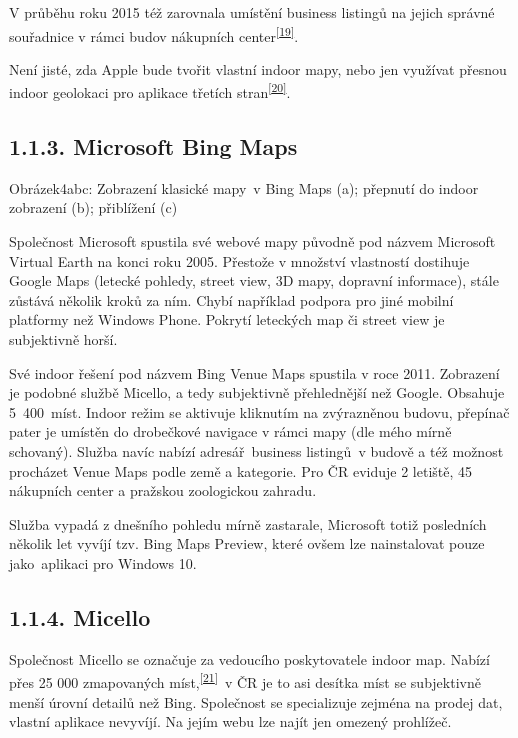 V průběhu roku 2015 též zarovnala umístění business listingů na jejich správné souřadnice v rámci budov nákupních center\textsuperscript{\href{}{{[}19{]}}}.~

Není jisté, zda Apple bude tvořit vlastní indoor mapy, nebo jen využívat přesnou indoor geolokaci pro aplikace třetích stran\textsuperscript{\href{}{{[}20{]}}}.

\subsection{1.1.3. Microsoft Bing Maps}\label{microsoft-bing-maps}

Obrázek4abc: Zobrazení klasické mapy~v Bing Maps (a); přepnutí do indoor zobrazení (b); přiblížení (c)

Společnost Microsoft spustila své webové mapy původně pod názvem Microsoft Virtual Earth na konci roku 2005. Přestože v množství vlastností dostihuje Google Maps (letecké pohledy, street view, 3D mapy, dopravní informace), stále zůstává několik kroků za ním. Chybí například podpora pro jiné mobilní platformy než Windows Phone. Pokrytí leteckých map či street view je subjektivně horší.

Své indoor řešení pod názvem Bing Venue Maps spustila v roce 2011. Zobrazení je podobné službě Micello, a tedy subjektivně přehlednější než Google. Obsahuje 5~400~míst. Indoor režim se aktivuje kliknutím na zvýrazněnou budovu, přepínač pater je umístěn do drobečkové navigace v rámci mapy (dle mého mírně schovaný). Služba navíc nabízí adresář~business listingů~v budově a též možnost procházet Venue Maps podle země a kategorie. Pro ČR eviduje 2 letiště, 45 nákupních center a pražskou zoologickou zahradu.

Služba vypadá z dnešního pohledu mírně zastarale, Microsoft totiž posledních několik let vyvíjí tzv. Bing Maps Preview, které ovšem lze nainstalovat pouze jako~aplikaci pro Windows 10.

\subsection{1.1.4. Micello}\label{micello}

Společnost Micello se označuje za vedoucího poskytovatele indoor map. Nabízí přes 25 000 zmapovaných míst,\textsuperscript{\href{}{{[}21{]}}}~v ČR je to asi desítka míst se subjektivně menší úrovní detailů než Bing. Společnost se specializuje zejména na prodej dat, vlastní aplikace nevyvíjí. Na jejím webu lze najít jen omezený prohlížeč.


